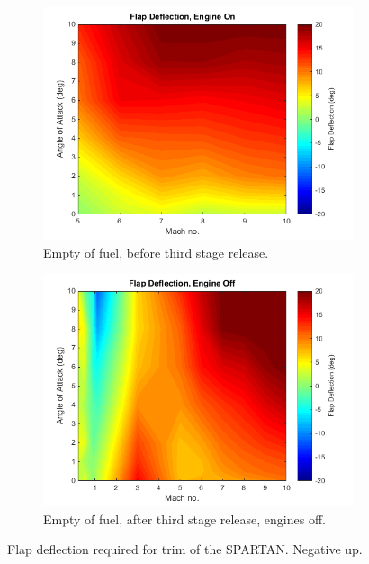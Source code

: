 \begin{figure}
\begin{subfigure}{.5\textwidth}
			\end{subfigure}
			\begin{subfigure}{.5\textwidth}
				\centering
				\includegraphics[width=0.99\linewidth]{figures/3_vehicle_design/FlapEngineCG3}
				\caption{Empty of fuel, before third stage release.}
				
			\end{subfigure}
			\begin{subfigure}{.5\textwidth}
				\centering
				\includegraphics[width=0.99\linewidth]{figures/3_vehicle_design/FlapNoEngineCG4}
				\caption{Empty of fuel, after third stage release, engines off.}
				
			\end{subfigure}
			\caption{Flap deflection required for trim of the SPARTAN. Negative up.}
			\label{fig:FlapDeflection}
		\end{figure}
		
